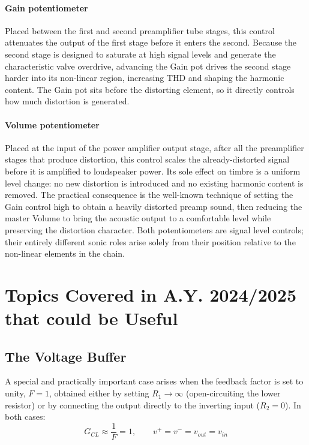 \paragraph{Gain potentiometer} Placed between the first and second preamplifier tube stages, this control attenuates the output of the first stage before it enters the second. Because the second stage is designed to saturate at high signal levels and generate the characteristic valve overdrive, advancing the Gain pot drives the second stage harder into its non-linear region, increasing THD and shaping the harmonic content. The Gain pot sits before the distorting element, so it directly controls how much distortion is generated.

\paragraph{Volume potentiometer} Placed at the input of the power amplifier output stage, after all the preamplifier stages that produce distortion, this control scales the already-distorted signal before it is amplified to loudspeaker power. Its sole effect on timbre is a uniform level change: no new distortion is introduced and no existing harmonic content is removed. The practical consequence is the well-known technique of setting the Gain control high to obtain a heavily distorted preamp sound, then reducing the master Volume to bring the acoustic output to a comfortable level while preserving the distortion character. Both potentiometers are signal level controls; their entirely different sonic roles arise solely from their position relative to the non-linear elements in the chain.

\section{Topics Covered in A.Y. 2024/2025 that could be Useful}

\subsection{The Voltage Buffer}

A special and practically important case arises when the feedback factor is set to unity, \( F = 1 \), obtained either by setting \( R_1 \to \infty \) (open-circuiting the lower resistor) or by connecting the output directly to the inverting input (\( R_2 = 0 \)). In both cases:
\[
G_{CL} \approx \frac{1}{F} = 1,
\qquad v^{+} = v^{-} = v_{out} = v_{in}
\]


